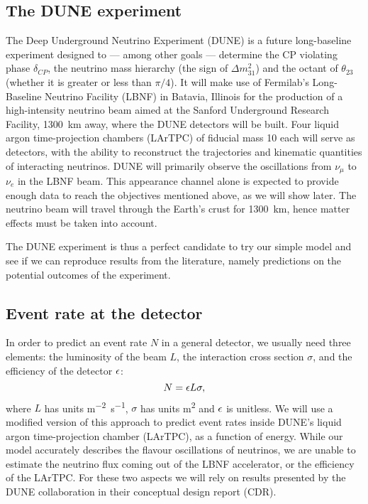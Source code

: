 \subsection{The DUNE experiment}
The Deep Underground Neutrino Experiment (DUNE) is a future long-baseline
experiment designed to --- among other goals --- determine the CP violating phase
$\delta_{CP}$, the neutrino mass hierarchy (the sign of $\Delta m^2_{31}$) and
the octant of $\theta_{23}$ (whether it is greater or less than 
$\pi/4$)\cite{cdr}. 
It will make use of Fermilab's Long-Baseline Neutrino Facility (LBNF) in Batavia,
Illinois for the production of a high-intensity neutrino beam aimed at the
Sanford Underground Research Facility, \SI{1300}{\km} away, where the DUNE
detectors will be built.
Four liquid argon time-projection chambers (LArTPC) of fiducial mass
\SI{10}{\kt} each will serve as detectors, with the ability to reconstruct the
trajectories and kinematic quantities of interacting neutrinos.
DUNE will primarily observe the oscillations from $\nu_\mu$ to $\nu_e$ in the
LBNF beam. This appearance channel alone is expected to provide enough data to
reach the objectives mentioned above, as we will show later.
The neutrino beam will travel through the Earth's crust for \SI{1300}{\km},
hence matter effects must be taken into account.

The DUNE experiment is thus a perfect candidate to try our simple model and see if
we can reproduce results from the literature, namely predictions on the
potential outcomes of the experiment.

\subsection{Event rate at the detector}\label{sec:event}
In order to predict an event rate $N$ in a general detector, we usually need three
elements: the luminosity of the beam $L$, the interaction cross section $\sigma$, and the
efficiency of the detector $\epsilon$:
\begin{equation}N = \epsilon L \sigma,\label{eq:rate}\end{equation}
where $L$ has units \si{\m^{-2} \s^{-1}}, $\sigma$ has units \si{\m^2} and
$\epsilon$ is unitless.
We will use a modified version of this approach to predict event rates inside
DUNE's liquid argon time-projection chamber (LArTPC), as a function of
energy. While our model
accurately describes the flavour oscillations of neutrinos, we are unable to
estimate the neutrino flux coming out of the LBNF accelerator, or the
efficiency of the LArTPC. For these two aspects we will rely on results
presented by the DUNE collaboration in their conceptual design report (CDR).

